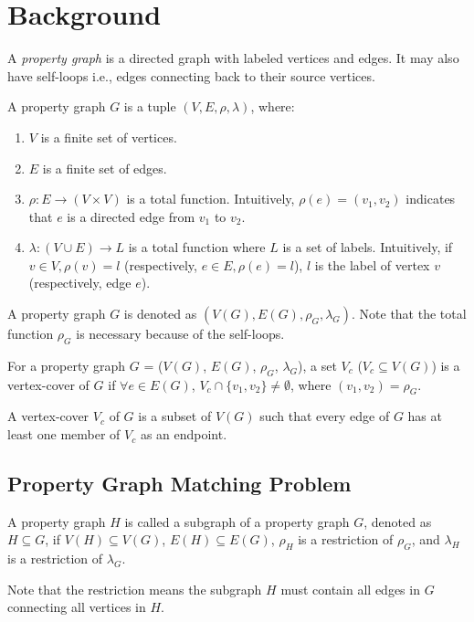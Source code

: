 \section{Background}\label{sec:background}
A \emph{property graph} is a directed graph with labeled vertices and edges. It may also have self-loops i.e., edges connecting back to their source vertices.

\begin{definition}
  A property graph $G$ is a tuple $(V, E, \rho, \lambda)$, where:
  \begin{enumerate}[noitemsep,label={(\arabic*)}]
  \item $V$ is a finite set of vertices.
  \item $E$ is a finite set of edges.
  \item $\rho: E \rightarrow (V \times V)$ is a total function.
    Intuitively, $\rho(e) = (v_1, v_2)$ indicates that $e$ is a directed edge from $v_1$ to $v_2$.
  \item $\lambda :(V \cup E) \rightarrow L$ is a total function where $L$ is a set of labels.
    Intuitively, if $v \in V, \rho(v) = l$ (respectively, $e \in E, \rho(e) = l$),
    $l$ is the label of vertex $v$ (respectively, edge $e$).
  \end{enumerate}
\end{definition}
A property graph $G$ is denoted as $(V(G), E(G), \rho_G, \lambda_G)$.
Note that the total function $\rho_G$ is necessary because of the self-loops.

\begin{definition}
  For a property graph $G$ = ($V(G)$, $E(G)$, $\rho_G$, $\lambda_G$), a set $V_c$ ($V_c \subseteq V(G)$) is a vertex-cover of $G$
  if $\forall e \in E(G)$, $V_c \cap \{ v_1, v_2 \} \ne \emptyset$, where $(v_1, v_2) = \rho_G$.
\end{definition}
A vertex-cover $V_c$ of $G$ is a subset of $V(G)$ such that every edge of $G$ has at least one member of $V_c$ as an endpoint.
\subsection{Property Graph Matching Problem}
\begin{definition}[Subgraph]
  A property graph $H$ is called a subgraph of a property graph $G$, denoted as $H \subseteq G$, if
  $V(H) \subseteq V(G)$, $E(H) \subseteq E(G)$, $\rho_H$ is a restriction of $\rho_G$, and $\lambda_H$ is a restriction of $\lambda_G$.
\end{definition}
Note that the restriction means the subgraph $H$ must contain all edges in $G$ connecting all vertices in $H$.

